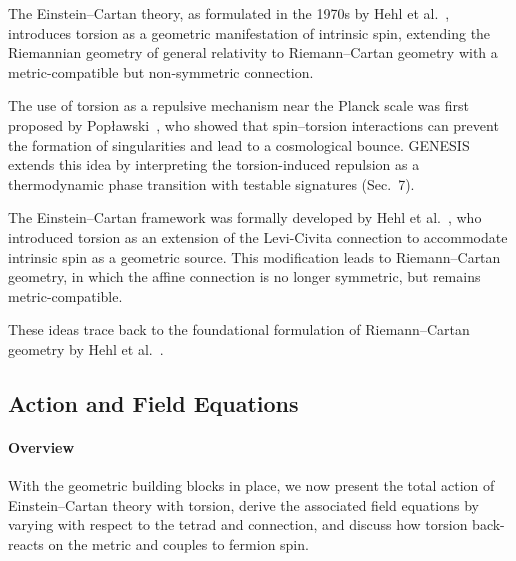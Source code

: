 \documentclass{article}
\begin{document}
\medskip
\begin{center}
\end{center}
\medskip


The Einstein–Cartan theory, as formulated in the 1970s by Hehl et al.~\cite{hehl1976}, introduces torsion as a geometric manifestation of intrinsic spin, extending the Riemannian geometry of general relativity to Riemann–Cartan geometry with a metric-compatible but non-symmetric connection.


The use of torsion as a repulsive mechanism near the Planck scale was first proposed by Popławski~\cite{Poplawski2010}, who showed that spin–torsion interactions can prevent the formation of singularities and lead to a cosmological bounce.
GENESIS extends this idea by interpreting the torsion-induced repulsion as a thermodynamic phase transition with testable signatures (Sec.~7).


The Einstein–Cartan framework was formally developed by Hehl et al.~\cite{hehl1976}, who introduced torsion as an extension of the Levi-Civita connection to accommodate intrinsic spin as a geometric source. This modification leads to Riemann–Cartan geometry, in which the affine connection is no longer symmetric, but remains metric-compatible.

These ideas trace back to the foundational formulation of Riemann–Cartan geometry by Hehl et al.~\cite{hehl1976}.


\subsection{Action and Field Equations}
\label{sec:ec-action}

\paragraph{Overview}
With the geometric building blocks in place, we now present the total action of Einstein–Cartan theory with torsion, derive the associated field equations by varying with respect to the tetrad and connection, and discuss how torsion back-reacts on the metric and couples to fermion spin.
\end{document}
